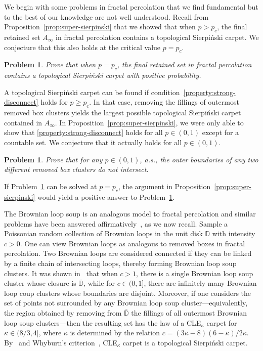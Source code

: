 \documentclass[a4paper]{article}
\numberwithin{equation}{section}
\newtheorem{prob}[theorem]{\bf Problem}
\numberwithin{equation}{section}
\renewcommand{\1}{\mathbf{1}}
\begin{document}
We begin with some problems in fractal percolation that we find fundamental but to the best of our knowledge are not well understood. Recall from Proposition~\ref{prop:super-sierpinski} that we showed that when $p > p_c$, the final retained set $A_\infty$ in fractal percolation contains a topological Sierpi\'nski carpet. We conjecture that this also holds at the critical value $p = p_c$.

\begin{prob}\label{prob:critical-TSC}
    Prove that when $p = p_c$, the final retained set in fractal percolation contains a topological Sierpi\'nski carpet with positive probability.
\end{prob}

A topological Sierpi\'nski carpet can be found if condition~\eqref{property:strong-disconnect} holds for $p \ge p_c$. In that case, removing the fillings of outermost removed box clusters yields the largest possible topological Sierpi\'nski carpet contained in $A_\infty$. In Proposition~\ref{prop:super-sierpinski}, we were only able to show that \eqref{property:strong-disconnect} holds for all $p \in (0,1)$ except for a countable set. We conjecture that it actually holds for all $p \in (0,1)$.

\begin{prob}\label{prob:fractal-strong-disconnect}
    Prove that for any $p \in (0,1)$, a.s., the outer boundaries of any two different removed box clusters do not intersect.
\end{prob}

If Problem~\ref{prob:fractal-strong-disconnect} can be solved at $p = p_c$, the argument in Proposition~\ref{prop:super-sierpinski} would yield a positive answer to Problem~\ref{prob:critical-TSC}.

The Brownian loop soup is an analogous model to fractal percolation and similar problems have been answered affirmatively~\cite{SW-CLE}, as we now recall. Sample a Poissonian random collection of Brownian loops in the unit disk $\mathbb D$ with intensity $c>0$. One can view Brownian loops as analogous to removed boxes in fractal percolation. Two Brownian loops are considered connected if they can be linked by a finite chain of intersecting loops, thereby forming Brownian loop soup clusters. It was shown in~\cite{SW-CLE} that when $c > 1$, there is a single Brownian loop soup cluster whose closure is $\overline{\mathbb D}$, while for $c \in (0,1]$, there are infinitely many Brownian loop coup clusters whose boundaries are disjoint. Moreover, if one considers the set of points not surrounded by any Brownian loop soup cluster---equivalently, the region obtained by removing from $\overline{\mathbb{D}}$ the fillings of all outermost Brownian loop soup clusters---then the resulting set has the law of a CLE$_\kappa$ carpet for $\kappa \in (8/3,4]$, where $\kappa$ is determined by the relation $c = (3 \kappa - 8)(6 - \kappa)/ 2 \kappa$. By~\cite{SW-CLE} and Whyburn's criterion~\cite{Whyburn-carpet}, CLE$_\kappa$ carpet is a topological Sierpi\'nski carpet.
\end{document}
